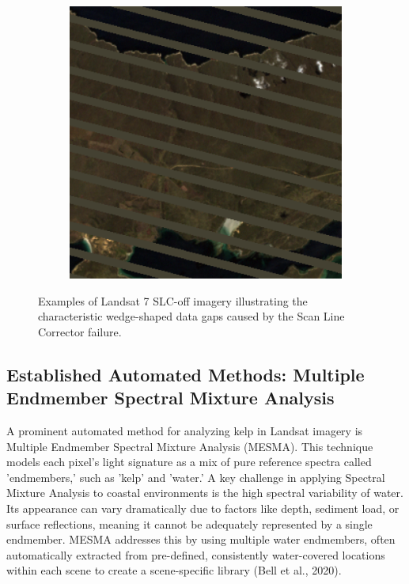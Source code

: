 \documentclass{article}
\begin{document}
\begin{figure}[htbp]
\begin{subfigure}[b]{0.3\textwidth}
      \label{fig:slc2}
  \end{subfigure}
  \hfill %
  \begin{subfigure}[b]{0.3\textwidth}
      \includegraphics[width=\textwidth]{slc_image3.png} %
      \label{fig:slc3}
  \end{subfigure}
  \caption{Examples of Landsat 7 SLC-off imagery illustrating the characteristic wedge-shaped data gaps caused by the Scan Line Corrector failure.}
  \label{fig:slc_failure_examples}
\end{figure}


\subsection{Established Automated Methods: Multiple Endmember Spectral Mixture Analysis} 

A prominent automated method for analyzing kelp in Landsat imagery is Multiple Endmember Spectral Mixture Analysis (MESMA). This technique models each pixel's light signature as a mix of pure reference spectra called 'endmembers,' such as 'kelp' and 'water.' A key challenge in applying Spectral Mixture Analysis to coastal environments is the high spectral variability of water. Its appearance can vary dramatically due to factors like depth, sediment load, or surface reflections, meaning it cannot be adequately represented by a single endmember. MESMA addresses this by using multiple water endmembers, often automatically extracted from pre-defined, consistently water-covered locations within each scene to create a scene-specific library (Bell et al., 2020).
    
\end{document}
